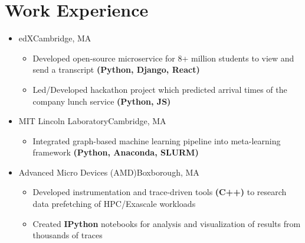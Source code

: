 \documentclass[11pt,letterpaper,sans]{moderncv}
\begin{document}
\section{Work Experience}

\vspace{-1pt}

\begin{itemize}

\item[] {
{edX}{Cambridge, MA}{}{\vspace{1pt}}
\vspace{-9pt}	\begin{itemize}
	 \item Developed open-source microservice for 8+ million students to view and send a transcript \textbf{(Python, Django, React)}
	 \item Led/Developed hackathon project which predicted arrival times of the company lunch service \textbf{(Python, JS)}
	\end{itemize}
}
\vspace{4pt}

\item[] {
{MIT Lincoln Laboratory}{Cambridge, MA}{}{\vspace{1pt}}
\vspace{-9pt}	\begin{itemize}
	 \item Integrated graph-based machine learning pipeline into meta-learning framework \textbf{(Python, Anaconda, SLURM)}
	\end{itemize}
}
\vspace{4pt}

\item[] {
{Advanced Micro Devices (AMD)}{Boxborough, MA}{}{\vspace{1pt}}
\vspace{-9pt}	\begin{itemize}
	 \item Developed instrumentation and trace-driven tools \textbf{(C++)} to research data prefetching of HPC/Exascale workloads
	 \item Created \textbf{IPython} notebooks for analysis and visualization of results from thousands of traces
	\end{itemize}
}
\vspace{4pt}


\end{itemize}
\end{document}
